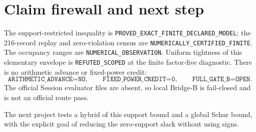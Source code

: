 \documentclass[10pt]{article}
\begin{document}
\section{Claim firewall and next step}

The support-restricted inequality is
\texttt{PROVED\_EXACT\_FINITE\_DECLARED\_MODEL}; the 216-record replay and
zero-violation census are \texttt{NUMERICALLY\_CERTIFIED\_FINITE}.  The
occupancy ranges are \texttt{NUMERICAL\_OBSERVATION}.  Uniform tightness of
this elementary envelope is \texttt{REFUTED\_SCOPED} at the finite factor-five
diagnostic.  There is no arithmetic advance or fixed-power credit:
\[
 \texttt{ARITHMETIC\_ADVANCE=NO},\qquad
 \texttt{FIXED\_POWER\_CREDIT=0},\qquad
 \texttt{FULL\_GATE\_B=OPEN}.
\]
The official Session evaluator files are absent, so local Bridge-B is
fail-closed and is not an official route pass.

The next project tests a hybrid of this support bound and a global Schur bound,
with the explicit goal of reducing the zero-support slack without using signs.
\end{document}
